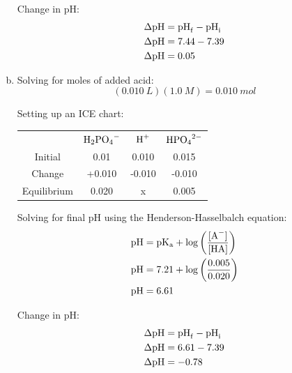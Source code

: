 \documentclass{article}
\begin{document}
\begin{enumerate}[(a)]
        Change in pH:
        \begin{align*}
            \Delta \rm{pH} &= \rm{pH}_f - \rm{pH}_i \\
            \Delta \rm{pH} &= 7.44 - 7.39 \\
            \Delta \rm{pH} &= 0.05
        \end{align*}

    \item Solving for moles of added acid:
        $$(0.010\ \si{L})(1.0\ \si{M}) = 0.010\ \si{mol}$$
        
        Setting up an ICE chart:
        \begin{center}
            \begin{tabular}{c c c c}
                & $\ce{H_2PO_4-}$ & $\ce{H+}$ & $\ce{HPO_4^{2-}}$ \\
                Initial & 0.01 & 0.010 & 0.015 \\
                Change & +0.010 & -0.010 & -0.010 \\
                Equilibrium & 0.020 & x & 0.005
            \end{tabular}
        \end{center}

        Solving for final pH using the Henderson-Hasselbalch equation:
        \begin{align*}
            \rm{pH} &= \rm{pK_a} + \log \left( \frac{[\ce{A-}]}{[\ce{HA}]}
            \right) \\
            \rm{pH} &= 7.21 + \log \left( \frac{0.005}{0.020} \right) \\
            \rm{pH} &= 6.61
        \end{align*}

        Change in pH:
        \begin{align*}
            \Delta \rm{pH} &= \rm{pH}_f - \rm{pH}_i \\
            \Delta \rm{pH} &= 6.61 - 7.39 \\
            \Delta \rm{pH} &= -0.78
        \end{align*}

\end{enumerate}
\end{document}
